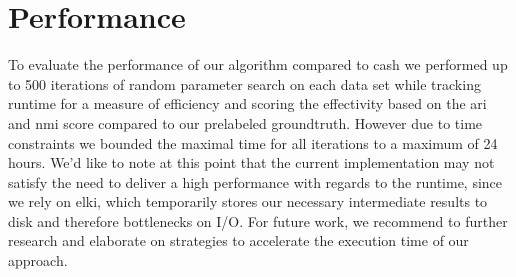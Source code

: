 \begin{figure}
\begin{minipage}[t]{.5\textwidth}
    \label{fig:my_label}
    \end{minipage}%
\end{figure}


\section{Performance}
 To evaluate the performance of our algorithm compared to \gls{cash} we performed up to 500 iterations of random parameter search on each data set while tracking runtime for a measure of efficiency and scoring the effectivity based on the \gls{ari} and \gls{nmi} score compared to our prelabeled groundtruth. However due to time constraints we bounded the maximal time for all iterations to a maximum of 24 hours. We’d like to note at this point that the current implementation may not satisfy the need to deliver a high performance with regards to the runtime, since we rely on \gls{elki}, which temporarily stores our necessary intermediate results to disk and therefore bottlenecks on I/O. For future work, we recommend to further research and elaborate on strategies to accelerate the execution time of our approach. 
 
\begin{table}[b]
\centering
{}
\caption{}
\label{tab:reducedsetup}
\end{table}
 
